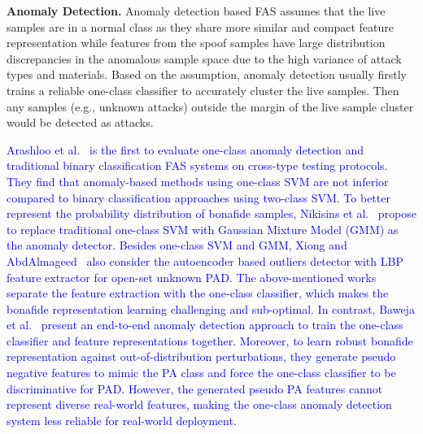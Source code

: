 \documentclass[10pt,journal,compsoc]{IEEEtran}
\begin{document}
\vspace{0.4em}
\noindent\textbf{Anomaly Detection.}\quad   
Anomaly detection based FAS assumes that the live samples are in a normal class as they share more similar and compact feature representation while features from the spoof samples have large distribution discrepancies in the anomalous sample space due to the high variance of attack types and materials. Based on the assumption, anomaly detection usually firstly trains a reliable one-class classifier to accurately cluster the live samples. Then any samples (e.g., unknown attacks) outside the margin of the live sample cluster would be detected as attacks.


\textcolor{blue}{Arashloo et al.~\cite{arashloo2017anomaly} is the first to evaluate one-class anomaly detection and traditional binary classification FAS systems on cross-type testing protocols. They find that anomaly-based methods using one-class SVM are not inferior compared to binary classification approaches using two-class SVM. To better represent the probability distribution of bonafide samples, Nikisins et al.~\cite{nikisins2018effectiveness} propose to replace traditional one-class SVM with Gaussian Mixture Model (GMM) as the anomaly detector. Besides one-class SVM and GMM, Xiong and AbdAlmageed~\cite{xiong2018unknown} also consider the autoencoder based outliers detector with LBP feature extractor for open-set unknown PAD. The above-mentioned works separate the feature extraction with the one-class classifier, which makes the bonafide representation learning challenging and sub-optimal. In contrast, Baweja et al.~\cite{baweja2020anomaly} present an end-to-end anomaly detection approach to train the one-class classifier and feature representations together. Moreover, to learn robust bonafide representation against out-of-distribution perturbations, they generate pseudo negative features to mimic the PA class and force the one-class classifier to be discriminative for PAD. However, the generated pseudo PA features cannot represent diverse real-world features, making the one-class anomaly detection system less reliable for real-world deployment.}
\end{document}
